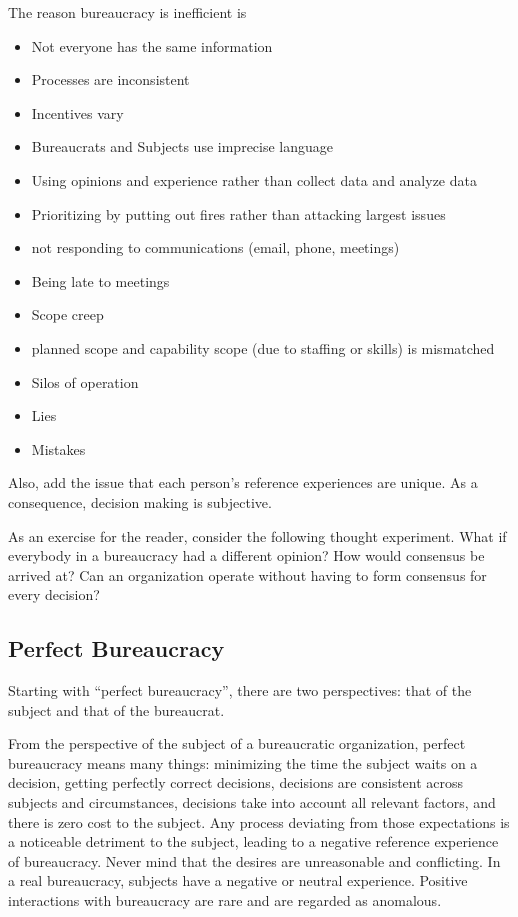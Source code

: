 The reason bureaucracy is inefficient is
\begin{itemize}
    \item Not everyone has the same information
    \item Processes are inconsistent
    \item Incentives vary
    \item Bureaucrats and Subjects use imprecise language
    \item Using opinions and experience rather than collect data and analyze data
    \item Prioritizing by putting out fires rather than attacking largest issues
    \item not responding to communications (email, phone, meetings)
    \item Being late to meetings
    \item Scope creep
    \item planned scope and capability scope (due to staffing or skills) is mismatched
    \item Silos of operation
    \item Lies
    \item Mistakes
\end{itemize}
Also, add the issue that each person's reference experiences are unique. As a consequence, decision making is subjective. 

As an exercise for the reader, consider the following thought experiment. 
What if everybody in a bureaucracy had a different opinion? How would consensus be arrived at? Can an organization operate without having to form consensus for every decision?



\subsection{Perfect Bureaucracy}

Starting with ``perfect bureaucracy'', there are two perspectives: that of the subject and that of the bureaucrat. 

From the perspective of the subject of a bureaucratic organization, perfect bureaucracy means many things: minimizing the time the subject waits on a decision, getting perfectly correct decisions, decisions are consistent across subjects and circumstances, decisions take into account all relevant factors, and there is zero cost to the subject. Any process deviating from those expectations is a noticeable detriment to the subject, leading to a negative reference experience of bureaucracy. Never mind that the desires are unreasonable and conflicting. In a real bureaucracy, subjects have a negative or neutral experience. Positive interactions with bureaucracy are rare and are regarded as anomalous.

